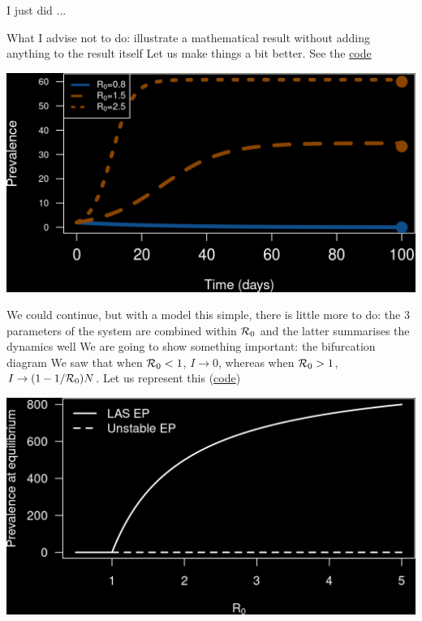 \documentclass[aspectratio=43]{beamer}
\begin{document}
\begin{frame}{I just did ...}

What I advise not to do: illustrate a mathematical result without adding anything to the result itself
\vfill
Let us make things a bit better. See the \href{https://raw.githubusercontent.com/julien-arino/petit-cours-epidemio-mathematique/main/CODE/ODE_SIS_multiple_solutions.R}{code}
\end{frame}

\begin{frame}{}
  \begin{center}
    \includegraphics[width=\textwidth]{../FIGS/ODE_SIS_multiple_solutions_blackBG.png}
  \end{center}
\end{frame}

\begin{frame}
We could continue, but with a model this simple, there is little  more to do: the 3 parameters of the system are combined within $\mathcal{R}_0$ and the latter summarises the dynamics well
\vfill
We are going to show something important: the bifurcation diagram
\vfill
We saw that when $\mathcal{R}_0<1$, $I\to 0$, whereas when $\mathcal{R}_0>1$, $I\to (1-1/\mathcal{R}_0)N$. Let us represent this (\href{https://raw.githubusercontent.com/julien-arino/petit-cours-epidemio-mathematique/main/CODE/SIS_PEI_vs_R0.R}{code})
\end{frame}

\begin{frame}
  \begin{center}
    \includegraphics[width=\textwidth]{../FIGS/endemic_SIS_EE_vs_R0_blackBG}
  \end{center}
\end{frame}
\end{document}
